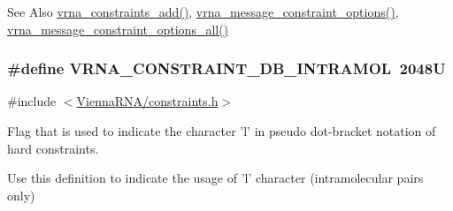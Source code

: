 \begin{DoxySeeAlso}{See Also}
\hyperlink{group__constraints_ga35a401f680969a556858a8dd5f1d07cc}{vrna\-\_\-constraints\-\_\-add()}, \hyperlink{group__constraints_gaa1f20b53bf09ac2e6b0dbb13f7d89670}{vrna\-\_\-message\-\_\-constraint\-\_\-options()}, \hyperlink{group__constraints_gaec7e13fa0465c2acc7a621d1aecb709f}{vrna\-\_\-message\-\_\-constraint\-\_\-options\-\_\-all()} 
\end{DoxySeeAlso}
\hypertarget{group__constraints_ga5c17253f5a39d1d49b0fb11f5196982a}{
\subsubsection[{V\-R\-N\-A\-\_\-\-C\-O\-N\-S\-T\-R\-A\-I\-N\-T\-\_\-\-D\-B\-\_\-\-I\-N\-T\-R\-A\-M\-O\-L}]{\setlength{\rightskip}{0pt plus 5cm}\#define V\-R\-N\-A\-\_\-\-C\-O\-N\-S\-T\-R\-A\-I\-N\-T\-\_\-\-D\-B\-\_\-\-I\-N\-T\-R\-A\-M\-O\-L~2048\-U}}\label{group__constraints_ga5c17253f5a39d1d49b0fb11f5196982a}


{\ttfamily \#include $<$\hyperlink{constraints_8h}{Vienna\-R\-N\-A/constraints.\-h}$>$}



Flag that is used to indicate the character 'l' in pseudo dot-\/bracket notation of hard constraints. 

Use this definition to indicate the usage of 'l' character (intramolecular pairs only)


